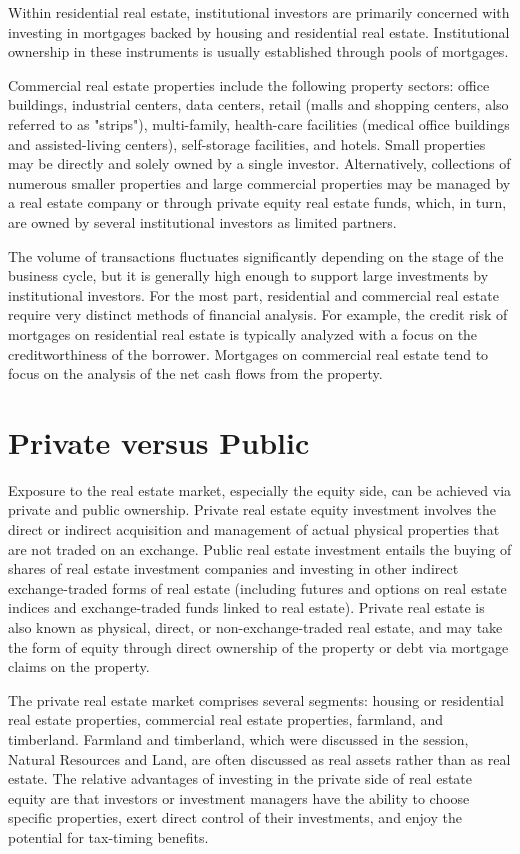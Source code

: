 \documentclass[11pt]{article}
\begin{document}
Within residential real estate, institutional investors are primarily concerned with investing in mortgages backed by housing and residential real estate. Institutional ownership in these instruments is usually established through pools of mortgages.

Commercial real estate properties include the following property sectors: office buildings, industrial centers, data centers, retail (malls and shopping centers, also referred to as "strips"), multi-family, health-care facilities (medical office buildings and assisted-living centers), self-storage facilities, and hotels. Small properties may be directly and solely owned by a single investor. Alternatively, collections of numerous smaller properties and large commercial properties may be managed by a real estate company or through private equity real estate funds, which, in turn, are owned by several institutional investors as limited partners.

The volume of transactions fluctuates significantly depending on the stage of the business cycle, but it is generally high enough to support large investments by institutional investors. For the most part, residential and commercial real estate require very distinct methods of financial analysis. For example, the credit risk of mortgages on residential real estate is typically analyzed with a focus on the creditworthiness of the borrower. Mortgages on commercial real estate tend to focus on the analysis of the net cash flows from the property.

\section*{Private versus Public}
Exposure to the real estate market, especially the equity side, can be achieved via private and public ownership. Private real estate equity investment involves the direct or indirect acquisition and management of actual physical properties that are not traded on an exchange. Public real estate investment entails the buying of shares of real estate investment companies and investing in other indirect exchange-traded forms of real estate (including futures and options on real estate indices and exchange-traded funds linked to real estate). Private real estate is also known as physical, direct, or non-exchange-traded real estate, and may take the form of equity through direct ownership of the property or debt via mortgage claims on the property.

The private real estate market comprises several segments: housing or residential real estate properties, commercial real estate properties, farmland, and timberland. Farmland and timberland, which were discussed in the session, Natural Resources and Land, are often discussed as real assets rather than as real estate. The relative advantages of investing in the private side of real estate equity are that investors or investment managers have the ability to choose specific properties, exert direct control of their investments, and enjoy the potential for tax-timing benefits.
\end{document}
